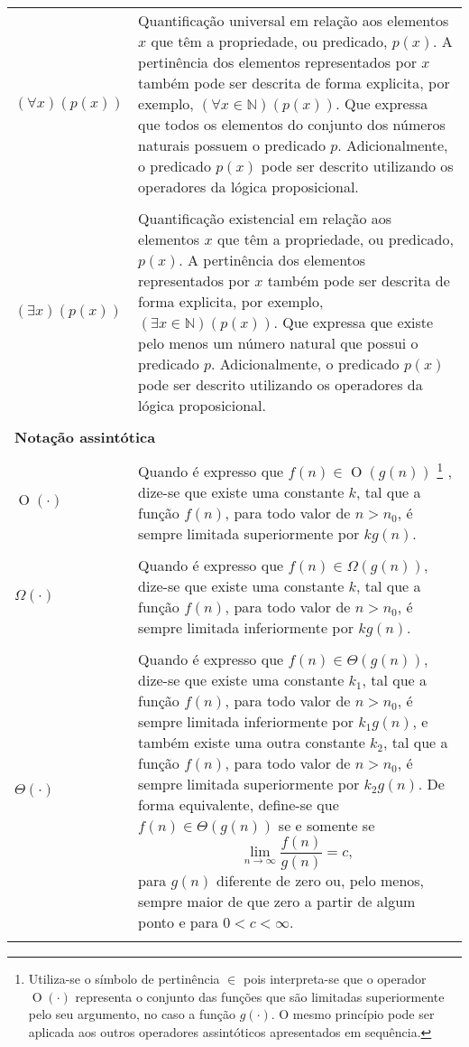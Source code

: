 \begin{longtable}{p{1in}p{4.5in}}
$(\forall x)(p(x))$ \dotfill &
\index{quantificador!universal}%
Quantificação universal em relação aos elementos $x$ que têm a propriedade,
ou predicado, $p(x)$.
A pertinência dos elementos representados por $x$ também pode ser descrita de
forma explicita, por exemplo, $(\forall x \in \mathbb{N})(p(x))$.
Que expressa que todos os elementos do conjunto dos números naturais possuem
o predicado $p$.
Adicionalmente, o predicado $p(x)$ pode ser descrito utilizando os operadores
da lógica proposicional.
\tabularnewline
\tabularnewline

$(\exists x)(p(x))$ \dotfill &
\index{quantificador!existencial}%
Quantificação existencial em relação aos elementos $x$ que têm a propriedade,
ou predicado, $p(x)$.
A pertinência dos elementos representados por $x$ também pode ser descrita de
forma explicita, por exemplo, $(\exists x \in \mathbb{N})(p(x))$.
Que expressa que existe pelo menos um número natural que possui o predicado
$p$.
Adicionalmente, o predicado $p(x)$ pode ser descrito utilizando os operadores
da lógica proposicional.
\tabularnewline
\tabularnewline

\multicolumn{2}{l}{\bf Notação assintótica}
\tabularnewline
\tabularnewline

$\operatorname{O}(\cdot)$ \dotfill &
\index{$\operatorname{O}(\cdot)$}%
Quando é expresso que $f(n) \in \operatorname{O}(g(n))$%
\footnote{Utiliza-se o símbolo de pertinência $\in$ pois interpreta-se que o
operador $\operatorname{O}(\cdot)$ representa o conjunto das funções que são
limitadas superiormente pelo seu argumento, no caso a função $g(\cdot)$.
O mesmo princípio pode ser aplicada aos outros operadores assintóticos
apresentados em sequência.}%
, dize-se que existe uma constante $k$, tal que a função $f(n)$, para todo
valor de $n>n_0$, é sempre limitada superiormente por $kg(n)$.
\tabularnewline
\tabularnewline

$\Omega(\cdot)$ \dotfill &
\index{$\Omega(\cdot)$}%
Quando é expresso que $f(n)\in\Omega(g(n))$, dize-se que existe uma constante
$k$, tal que a função $f(n)$, para todo valor de $n>n_0$, é sempre limitada
inferiormente por $kg(n)$.
\tabularnewline
\tabularnewline

$\Theta(\cdot)$ \dotfill &
\index{$\Theta(\cdot)$}%
Quando é expresso que $f(n)\in\Theta(g(n))$, dize-se que existe uma constante
$k_1$, tal que a função $f(n)$, para todo valor de $n>n_0$, é sempre limitada
inferiormente por $k_1g(n)$, e também existe uma outra constante $k_2$, tal
que a função $f(n)$, para todo valor de $n>n_0$, é sempre limitada
superiormente por $k_2g(n)$.
De forma equivalente, define-se que $f(n)\in\Theta(g(n))$ se e somente se
\begin{equation*}
\lim_{n\rightarrow\infty}\frac{f(n)}{g(n)}=c\text{,}
\end{equation*}
para $g(n)$ diferente de zero ou, pelo menos, sempre maior de que zero a
partir de algum ponto e para $0<c<\infty$.
\tabularnewline
\tabularnewline


\end{longtable}
